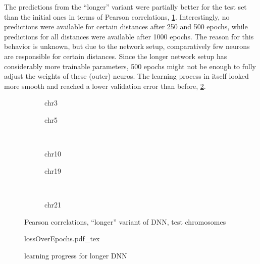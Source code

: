 The predictions from the ``longer'' variant were partially better for the test set than the initial ones in terms of
Pearson correlations, \cref{fig:results:longerDNN_pearson}.
Interestingly, no predictions were available for certain distances after 250 and 500 epochs, 
while predictions for all distances were available after 1000 epochs.
The reason for this behavior is unknown, but due to the network setup, 
comparatively few neurons are responsible for certain distances.
Since the longer network setup has considerably more trainable parameters,
500 epochs might not be enough to fully adjust the weights of these (outer) neuros.
The learning process in itself looked more smooth and reached a lower validation error than before, \cref{fig:results:longerDNN_lossEpochs}.
\begin{figure}[p]
    \begin{subfigure}{0.45\textwidth}
        \scriptsize
        \caption{chr3}
    \end{subfigure} \hfill
    \begin{subfigure}{0.45\textwidth}
        \scriptsize
        \caption{chr5}
    \end{subfigure}\\[5mm]
    \begin{subfigure}{0.45\textwidth}
        \scriptsize
        \caption{chr10}
    \end{subfigure}\hfill
    \begin{subfigure}{0.45\textwidth}
        \scriptsize
        \caption{chr19}
    \end{subfigure}\\[3mm]
    \centering
    \begin{subfigure}{0.45\textwidth}
        \scriptsize
        \caption{chr21}
    \end{subfigure}
    \caption{Pearson correlations, ``longer'' variant of DNN,  test chromosomes}
    \label{fig:results:longerDNN_pearson}
\end{figure}
\begin{figure}[hbp]
 \centering
 \scriptsize
 {lossOverEpochs.pdf_tex}
 \caption{learning progress for longer DNN} \label{fig:results:longerDNN_lossEpochs}
\end{figure}

